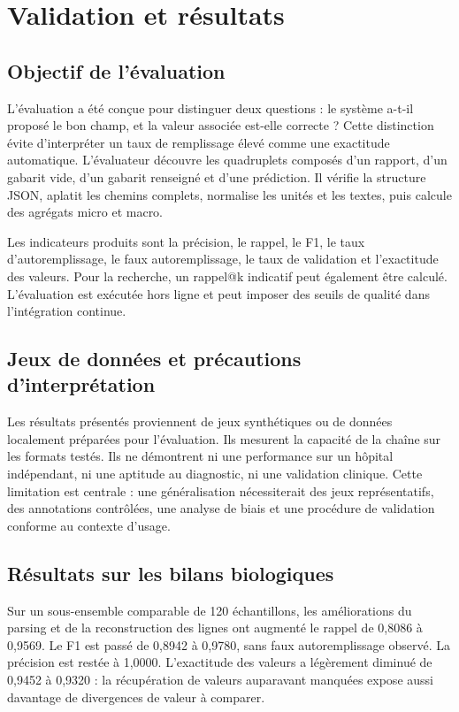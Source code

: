 \chapter{Validation et résultats}
\section{Objectif de l'évaluation}
L'évaluation a été conçue pour distinguer deux questions : le système a-t-il proposé le bon champ, et la valeur associée est-elle correcte ? Cette distinction évite d'interpréter un taux de remplissage élevé comme une exactitude automatique. L'évaluateur découvre les quadruplets composés d'un rapport, d'un gabarit vide, d'un gabarit renseigné et d'une prédiction. Il vérifie la structure JSON, aplatit les chemins complets, normalise les unités et les textes, puis calcule des agrégats micro et macro.

Les indicateurs produits sont la précision, le rappel, le F1, le taux d'autoremplissage, le faux autoremplissage, le taux de validation et l'exactitude des valeurs. Pour la recherche, un rappel@k indicatif peut également être calculé. L'évaluation est exécutée hors ligne et peut imposer des seuils de qualité dans l'intégration continue.

\section{Jeux de données et précautions d'interprétation}
Les résultats présentés proviennent de jeux synthétiques ou de données localement préparées pour l'évaluation. Ils mesurent la capacité de la chaîne sur les formats testés. Ils ne démontrent ni une performance sur un hôpital indépendant, ni une aptitude au diagnostic, ni une validation clinique. Cette limitation est centrale : une généralisation nécessiterait des jeux représentatifs, des annotations contrôlées, une analyse de biais et une procédure de validation conforme au contexte d'usage.

\section{Résultats sur les bilans biologiques}
Sur un sous-ensemble comparable de 120 échantillons, les améliorations du parsing et de la reconstruction des lignes ont augmenté le rappel de 0,8086 à 0,9569. Le F1 est passé de 0,8942 à 0,9780, sans faux autoremplissage observé. La précision est restée à 1,0000. L'exactitude des valeurs a légèrement diminué de 0,9452 à 0,9320 : la récupération de valeurs auparavant manquées expose aussi davantage de divergences de valeur à comparer.

